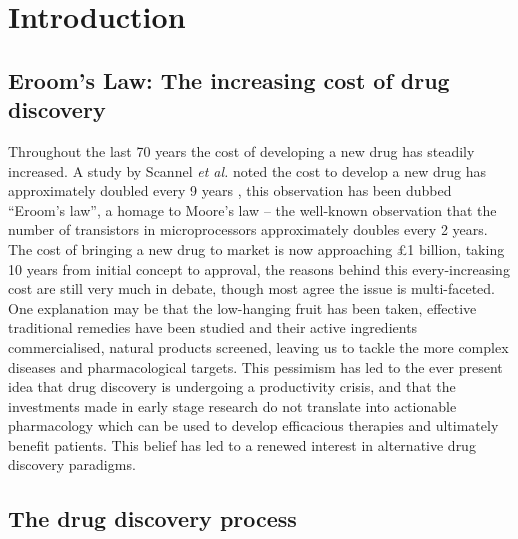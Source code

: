 \documentclass[a4paper,11pt,twoside,openright]{scrbook}
\begin{document}
\chapter{Introduction} \label{chapter:intro}


\section{Eroom's Law: The increasing cost of drug discovery}
Throughout the last 70 years the cost of developing a new drug has steadily increased.
A study by Scannel \textit{et al.} noted the cost to develop a new drug has approximately doubled every 9 years \cite{Scannell2012}, this observation has been dubbed ``Eroom's law'', a homage to Moore's law -- the well-known observation that the number of transistors in microprocessors approximately doubles every 2 years.
The cost of bringing a new drug to market is now approaching £1 billion, taking 10 years from initial concept to approval, the reasons behind this every-increasing cost are still very much in debate, though most agree the issue is multi-faceted.
One explanation may be that the low-hanging fruit has been taken, effective traditional remedies have been studied and their active ingredients commercialised, natural products screened, leaving us to tackle the more complex diseases and pharmacological targets.  
This pessimism has led to the ever present idea that drug discovery is undergoing a productivity crisis, and that the investments made in early stage research do not translate into actionable pharmacology which can be used to develop efficacious therapies and ultimately benefit patients.
This belief has led to a renewed interest in alternative drug discovery paradigms.


\section{The drug discovery process}
\end{document}
